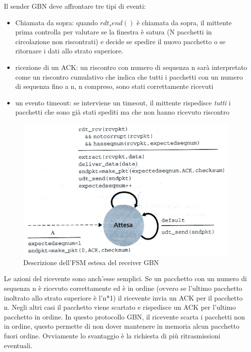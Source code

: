 \documentclass[11pt,a4paper]{article}
\begin{document}
Il sender GBN deve affrontare tre tipi di eventi:
\begin{itemize}
	\item Chiamata da sopra: quando $rdt_send()$ è chiamata da sopra, il mittente prima controlla per valutare se la finestra è satura (N pacchetti in circolazione non riscontrati) e decide se spedire il nuovo pacchetto o se ritornare i dati allo strato superiore.
	\item ricezione di un ACK: un riscontro con numero di sequenza n sarà interpretato come un riscontro cumulativo che indica che tutti i pacchetti con un numero di sequenza fino a n, n compreso, sono stati correttamente ricevuti
	\item un evento timeout: se interviene un timeout, il mittente rispedisce \emph{tutti} i pacchetti che sono già stati spediti ma che non hanno ricevuto riscontro
\end{itemize}
\begin{figure}
	\includegraphics[scale=0.6]{img/027.png}
	\caption{Descrizione dell'FSM estesa del receiver GBN}
\end{figure}
Le azioni del ricevente sono anch'esse semplici. Se un pacchetto con un numero di sequenza n è ricevuto correttamente ed è in ordine (ovvero se l'ultimo pacchetto inoltrato allo strato superiore è l'n*1) il ricevente invia un ACK per il pacchetto n. Negli altri casi il pacchetto viene scartato e rispedisce un ACK per l'ultimo pacchetto in ordine. In questo protocollo GBN, il ricevente scarta i pacchetti non in ordine, questo permette di non dover mantenere in memoria alcun pacchetto fuori ordine. Ovviamente lo svantaggio è la richiesta di più ritrasmissioni eventuali.
\end{document}
